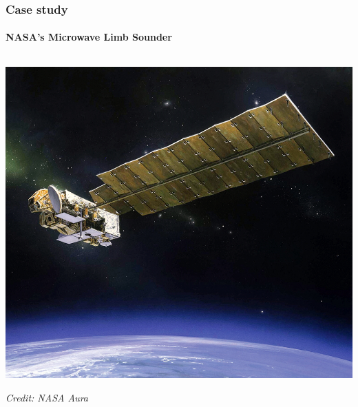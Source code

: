 \documentclass{snedecorbeamer}
\begin{document}
\begin{frame}
  \frametitle{Case study}
  \framesubtitle{NASA's Microwave Limb Sounder}

  \begin{columns}[t]
    \begin{column}{.50\textwidth}
      \begin{center}
        \vspace{-2ex}

        \includegraphics[height=.4\textheight]{aura.jpg}

        {\footnotesize \textit{Credit: NASA Aura}}

        \vspace{5ex}


\end{center}
\end{column}
\end{columns}
\end{frame}
\end{document}
